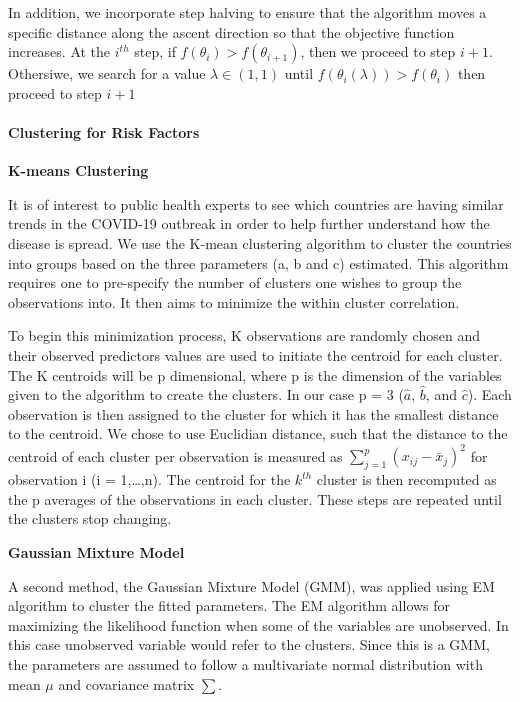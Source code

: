 \documentclass[]{article}
\let\oldparagraph\paragraph
\renewcommand{\paragraph}[1]{\oldparagraph{#1}\mbox{}}
\begin{document}
In addition, we incorporate step halving to ensure that the algorithm
moves a specific distance along the ascent direction so that the
objective function increases. At the \(i^{th}\) step, if
\(f(\theta_i) > f(\theta_{i+1})\), then we proceed to step \(i + 1\).
Othersiwe, we search for a value \(\lambda \in (1, 1)\) until
\(f(\theta_i(\lambda)) > f(\theta_i)\) then proceed to step \(i + 1\)

\hypertarget{clustering-for-risk-factors}{%
\paragraph{Clustering for Risk
Factors}\label{clustering-for-risk-factors}}

\textbf{K-means Clustering}

It is of interest to public health experts to see which countries are
having similar trends in the COVID-19 outbreak in order to help further
understand how the disease is spread. We use the K-mean clustering
algorithm to cluster the countries into groups based on the three
parameters (a, b and c) estimated. This algorithm requires one to
pre-specify the number of clusters one wishes to group the observations
into. It then aims to minimize the within cluster correlation.

To begin this minimization process, K observations are randomly chosen
and their observed predictors values are used to initiate the centroid
for each cluster. The K centroids will be p dimensional, where p is the
dimension of the variables given to the algorithm to create the
clusters. In our case p = 3 (\(\hat{a}\), \(\hat{b}\), and \(\hat{c}\)).
Each observation is then assigned to the cluster for which it has the
smallest distance to the centroid. We chose to use Euclidian distance,
such that the distance to the centroid of each cluster per observation
is measured as \(\sum_{j=1}^p(x_{ij}-\bar{x}_{j})^2\) for observation i
(i = 1,\ldots{},n). The centroid for the \(k^{th}\) cluster is then
recomputed as the p averages of the observations in each cluster. These
steps are repeated until the clusters stop changing.

\textbf{Gaussian Mixture Model}

A second method, the Gaussian Mixture Model (GMM), was applied using EM
algorithm to cluster the fitted parameters. The EM algorithm allows for
maximizing the likelihood function when some of the variables are
unobserved. In this case unobserved variable would refer to the
clusters. Since this is a GMM, the parameters are assumed to follow a
multivariate normal distribution with mean \(\mu\) and covariance matrix
\(\sum\).
\end{document}
